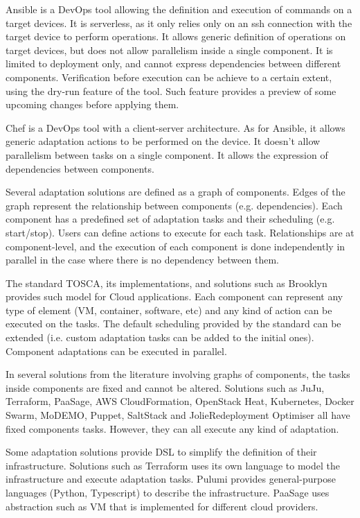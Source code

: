 \documentclass{article}
\begin{document}
Ansible is a DevOps tool allowing the definition and execution of commands on a target devices. It is serverless, as it only relies only on an ssh connection with the target device to perform operations. It allows generic definition of operations on target devices, but does not allow parallelism inside a single component. It is limited to deployment only, and cannot express dependencies between different components. Verification before execution can be achieve to a certain extent, using the dry-run feature of the tool. Such feature provides a preview of some upcoming changes before applying them. 

Chef is a DevOps tool with a client-server architecture. As for Ansible, it allows generic adaptation actions to be performed on the device. It doesn't allow parallelism between tasks on a single component. It allows the expression of dependencies between components.

Several adaptation solutions are defined as a graph of components. Edges of the graph represent the relationship between components (e.g. dependencies). Each component has a predefined set of adaptation tasks and their scheduling (e.g. start/stop). Users can define actions to execute for each task. Relationships are at component-level, and the execution of each component is done independently in parallel in the case where there is no dependency between them. 

The standard TOSCA, its implementations, and solutions such as Brooklyn provides such model for Cloud applications. Each component can represent any type of element (VM, container, software, etc) and any kind of action can be executed on the tasks. The default scheduling provided by the standard can be extended (i.e. custom adaptation tasks can be added to the initial ones). Component adaptations can be executed in parallel.

In several solutions from the literature involving graphs of components, the tasks inside components are fixed and cannot be altered. Solutions such as JuJu, Terraform, PaaSage, AWS CloudFormation, OpenStack Heat, Kubernetes, Docker Swarm, MoDEMO, Puppet, SaltStack and JolieRedeployment Optimiser all have fixed components tasks. However, they can all execute any kind of adaptation.

Some adaptation solutions provide DSL to simplify the definition of their infrastructure. Solutions such as Terraform uses its own language to model the infrastructure and execute adaptation tasks. Pulumi provides general-purpose languages (Python, Typescript) to describe the infrastructure. PaaSage uses abstraction such as VM that is implemented for different cloud providers.
\end{document}
